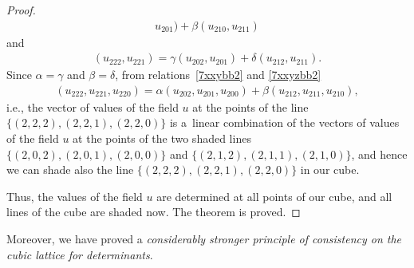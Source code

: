 \documentclass[pdftex]{sigma}
\begin{document}
\begin{proof}
\begin{gather}
u_{2 0 1}) + \beta (u_{2 1 0}, u_{2 1 1}) \label{7xxybb2}
\end{gather} and
\begin{gather}
(u_{2 2 2}, u_{2 2 1}) = \gamma (u_{2 0 2}, u_{2 0 1}) + \delta
(u_{2 1 2}, u_{2 1 1}). \label{7xxyzbb2}
\end{gather} Since $\alpha = \gamma$
and $\beta = \delta$, from relations~\eqref{7xxybb2} and
\eqref{7xxyzbb2}
\begin{gather*} (u_{2 2 2}, u_{2 2 1}, u_{2 2 0}) = \alpha
(u_{2 0 2}, u_{2 0 1}, u_{2 0 0}) + \beta (u_{2 1 2}, u_{2 1 1},
u_{2 1 0}), %
\end{gather*} i.e., the vector of values of the
f\/ield $u$ at the points of the line $\{(2, 2, 2), (2, 2, 1), (2, 2,
0)\}$ is a~linear combination of the vectors of values of the f\/ield
$u$ at the points of the two shaded lines $\{(2, 0, 2), (2, 0, 1),
(2, 0, 0)\}$ and $\{(2, 1, 2), (2, 1, 1), (2, 1, 0)\}$, and hence we
can shade also the line $\{(2, 2, 2), (2, 2, 1), (2, 2, 0)\}$ in our
cube.


Thus, the values of the f\/ield $u$ are determined at all points of
our cube, and all lines of the cube are shaded now. The theorem is
proved.
\end{proof}

Moreover, we have proved a {\it considerably stronger principle of
consistency on the cubic lattice for determinants}.
\end{document}

